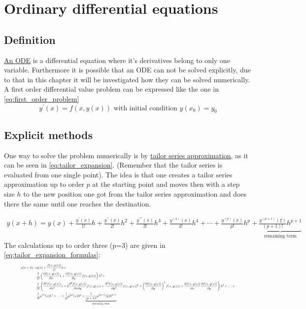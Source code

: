 \section{Ordinary differential equations}
\subsection{Definition}
\href{https://en.wikipedia.org/wiki/Ordinary_differential_equation}{An ODE} is a differential equation where it's derivatives belong to only one variable. Furthermore it is possible that an ODE can not be solved explicitly, due to that in this chapter it will be investigated how they can be solved numerically. \newline A first order differential value problem can be expressed like the one in \autoref{eq:first_order_problem}
\begin{equation}\label{eq:first_order_problem}
y^{\prime}(x)=f(x, y(x)) \text{  with initial condition  }y\left(x_0\right)=y_0
\end{equation}
\subsection{Explicit methods}
One way to solve the problem numerically is by \href{https://en.wikipedia.org/wiki/Taylor_series}{tailor series approximation}, as it can be seen in \autoref{eq:tailor_expansion}. (Remember that the tailor series is evaluated from one single point). The idea is that one creates a tailor series approximation up to order $p$ at the starting point and moves then with a step size $h$ to the new position one got from the tailor series approximation and does there the same until one reaches the destination.

\begin{multline}\label{eq:tailor_expansion}
y(x+h)= y(x)+\frac{y^{\prime}(x)}{1 !} h+\frac{y^{\prime \prime}(x)}{2 !} h^2+\frac{y^{\prime \prime \prime}(x)}{3 !} h^3 + \frac{y^{(4)}(x)}{4 !} h^4+\cdots+\frac{y^{(p)}(x)}{p !} h^p+\underbrace{\frac{y^{(p+1)}(\xi)}{(p+1) !} h^{p+1}}_{\text {remaining term}}
\end{multline}
The calculations up to order three (p=3) are given in \autoref{eq:tailor_expansion_formulas}:
\begin{equation}\label{eq:tailor_expansion_formulas}
\resizebox{.9\hsize}{!}{$
\begin{aligned}
y(x+h)= & y(x)+\frac{f(x, y(x))}{1 !} h+ \\
& \frac{1}{2 !}\left(\frac{\partial f(x, y(x))}{\partial x} 1+\frac{\partial f(x, y(x))}{\partial y} f(x, y(x))\right) h^2+ \\
& \frac{1}{3 !}\left(\frac{\partial^2 f(x, y(x))}{\partial x^2} 1+2 \frac{\partial^2 f(x, y(x))}{\partial x \partial y} f(x, y(x))+\frac{\partial^2 f(x, y(x))}{\partial y^2} f(x, y(x))^2+\left(\frac{\partial f(x, y(x))}{\partial y}\right)^2 f(x, y(x))+\frac{\partial f(x, y(x))}{\partial x} \frac{\partial f(x, y(x))}{\partial y}\right) h^3+\ldots+ \\
& \frac{1}{4 !} y^{(4)}(x) h^4+\ldots+\frac{1}{p !} y^{(p)}(x) h^p+\underbrace{\frac{1}{(p+1) !} y^{(p+1)}(\xi) h^{p+1}}_{\text {remaining term}}
\end{aligned}$}
\end{equation}
